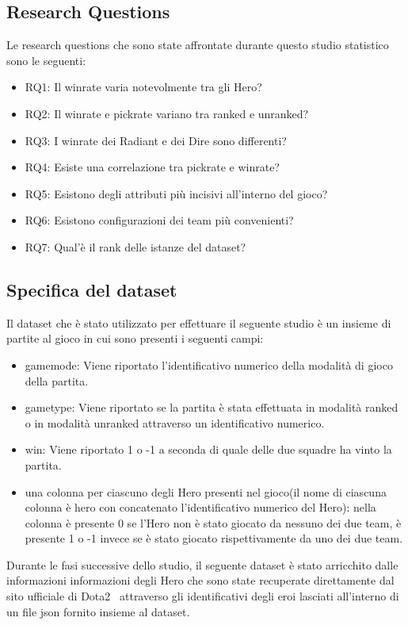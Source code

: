\subsection{Research Questions}
Le research questions che sono state affrontate durante questo studio statistico sono le seguenti:
\begin{itemize}
	\item {RQ1: Il winrate varia notevolmente tra gli Hero?}
	\item {RQ2: Il winrate e pickrate variano tra ranked e unranked?}
	\item {RQ3: I winrate dei Radiant e dei Dire sono differenti?}
	\item {RQ4: Esiste una correlazione tra pickrate e winrate? }
	\item {RQ5: Esistono degli attributi più incisivi all'interno del gioco?}
	\item {RQ6: Esistono configurazioni dei team più convenienti?}
	\item {RQ7: Qual'è il rank delle istanze del dataset?}
\end{itemize}

\subsection{Specifica del dataset}
Il dataset che è stato utilizzato per effettuare il seguente studio è un insieme di partite al gioco in cui sono presenti i seguenti campi:
\begin{itemize}
    \item gamemode: Viene riportato l'identificativo numerico della modalità di gioco della partita.
    \item gametype: Viene riportato se la partita è stata effettuata in modalità ranked o in modalità unranked attraverso un identificativo numerico.
    \item win: Viene riportato 1 o -1 a seconda di quale delle due squadre ha vinto la partita.
    \item una colonna per ciascuno degli Hero presenti nel gioco(il nome di ciascuna colonna è hero con concatenato l'identificativo numerico del Hero): nella colonna è presente 0 se l'Hero non è stato giocato da nessuno dei due team, è presente 1 o -1 invece se è stato giocato rispettivamente da uno dei due team. 
\end{itemize}
Durante le fasi successive dello studio, il seguente dataset è stato arricchito dalle informazioni informazioni degli Hero che sono state recuperate direttamente dal sito ufficiale di Dota2~\cite{Dota2OfficialSite} attraverso gli identificativi degli eroi lasciati all'interno di un file json fornito insieme al dataset. \\
